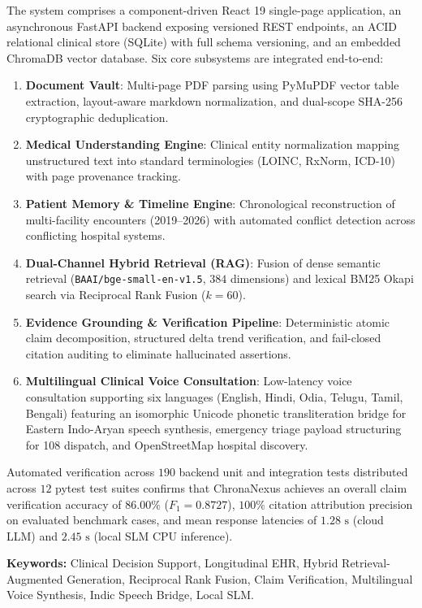 The system comprises a component-driven React 19 single-page application, an asynchronous FastAPI backend exposing versioned REST endpoints, an ACID relational clinical store (SQLite) with full schema versioning, and an embedded ChromaDB vector database. Six core subsystems are integrated end-to-end:
\begin{enumerate}
  \item \textbf{Document Vault}: Multi-page PDF parsing using PyMuPDF vector table extraction, layout-aware markdown normalization, and dual-scope SHA-256 cryptographic deduplication.
  \item \textbf{Medical Understanding Engine}: Clinical entity normalization mapping unstructured text into standard terminologies (LOINC, RxNorm, ICD-10) with page provenance tracking.
  \item \textbf{Patient Memory \& Timeline Engine}: Chronological reconstruction of multi-facility encounters (2019--2026) with automated conflict detection across conflicting hospital systems.
  \item \textbf{Dual-Channel Hybrid Retrieval (RAG)}: Fusion of dense semantic retrieval (\texttt{BAAI/\allowbreak bge-small-\allowbreak en-v1.5}, $384$ dimensions) and lexical BM25 Okapi search via Reciprocal Rank Fusion ($k=60$).
  \item \textbf{Evidence Grounding \& Verification Pipeline}: Deterministic atomic claim decomposition, structured delta trend verification, and fail-closed citation auditing to eliminate hallucinated assertions.
  \item \textbf{Multilingual Clinical Voice Consultation}: Low-latency voice consultation supporting six languages (English, Hindi, Odia, Telugu, Tamil, Bengali) featuring an isomorphic Unicode phonetic transliteration bridge for Eastern Indo-Aryan speech synthesis, emergency triage payload structuring for 108 dispatch, and OpenStreetMap hospital discovery.
\end{enumerate}

Automated verification across $190$ backend unit and integration tests distributed across $12$ pytest test suites confirms that ChronaNexus achieves an overall claim verification accuracy of $86.00\%$ ($F_1 = 0.8727$), $100\%$ citation attribution precision on evaluated benchmark cases, and mean response latencies of $1.28\text{ s}$ (cloud LLM) and $2.45\text{ s}$ (local SLM CPU inference).

\vspace{0.8cm}
\noindent
\textbf{Keywords:} Clinical Decision Support, Longitudinal EHR, Hybrid Retrieval-Augmented Generation, Reciprocal Rank Fusion, Claim Verification, Multilingual Voice Synthesis, Indic Speech Bridge, Local SLM.

\clearpage

